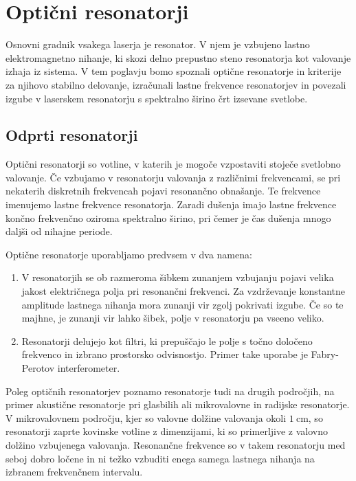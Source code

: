
\chapter{Optični resonatorji}
Osnovni gradnik vsakega laserja je resonator. V njem je vzbujeno lastno elektromagnetno
nihanje, ki skozi delno prepustno steno resonatorja kot valovanje
izhaja iz sistema. V tem poglavju bomo 
spoznali optične resonatorje in kriterije za njihovo stabilno delovanje,
izračunali lastne frekvence resonatorjev in povezali izgube v laserskem resonatorju s
spektralno širino črt izsevane svetlobe. 

\section{Odprti resonatorji}
Optični resonatorji so votline, v katerih je mogoče 
vzpostaviti stoječe svetlobno valovanje. Če vzbujamo v resonatorju valovanja z 
različnimi frekvencami, se pri nekaterih diskretnih frekvencah pojavi resonančno
obnašanje. Te frekvence imenujemo lastne frekvence
resonatorja. Zaradi dušenja imajo lastne frekvence končno frekvenčno oziroma spektralno 
širino, pri čemer je čas dušenja mnogo daljši od nihajne periode. 

Optične resonatorje uporabljamo predvsem v dva namena:
\begin{enumerate}
\item V resonatorjih se ob razmeroma šibkem zunanjem vzbujanju pojavi velika jakost
električnega polja pri resonančni frekvenci. Za vzdrževanje
konstantne amplitude lastnega nihanja mora zunanji vir zgolj pokrivati izgube. 
Če so te majhne, je zunanji vir lahko šibek, polje
v resonatorju pa vseeno veliko.\\
\item Resonatorji delujejo kot filtri, ki prepuščajo le polje s točno  
določeno frekvenco in izbrano prostorsko odvisnostjo. Primer take uporabe je 
Fabry-Perotov interferometer. 
\end{enumerate}

\begin{remark}
Poleg optičnih resonatorjev poznamo resonatorje tudi na drugih področjih, 
na primer akustične resonatorje pri glasbilih ali mikrovalovne in radijske resonatorje. 
V mikrovalovnem področju, kjer so valovne dolžine valovanja
okoli $1~\si{\centi\metre}$, 
so resonatorji zaprte kovinske votline z dimenzijami, ki so primerljive z 
valovno dolžino vzbujenega valovanja. Resonančne frekvence so v takem resonatorju 
med seboj dobro ločene in ni težko vzbuditi enega samega lastnega nihanja na izbranem 
frekvenčnem intervalu.
\end{remark}

